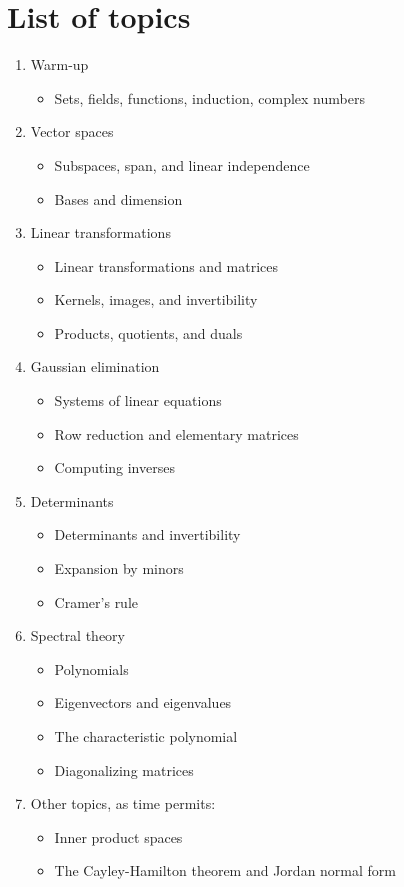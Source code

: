 \documentclass[11pt,oneside]{amsart}
\begin{document}
\section{List of topics}
\begin{enumerate}
    \item Warm-up
    \begin{itemize}
        \item Sets, fields, functions, induction, complex numbers
    \end{itemize}

    \item Vector spaces
    \begin{itemize}
        \item Subspaces, span, and linear independence
        \item Bases and dimension
    \end{itemize}

    \item Linear transformations
    \begin{itemize}
        \item Linear transformations and matrices
        \item Kernels, images, and invertibility
        \item Products, quotients, and duals
    \end{itemize}

    \item Gaussian elimination
    \begin{itemize}
        \item Systems of linear equations
        \item Row reduction and elementary matrices
        \item Computing inverses
    \end{itemize}

    \item Determinants
    \begin{itemize}
        \item Determinants and invertibility
        \item Expansion by minors
        \item Cramer's rule
    \end{itemize}

    \item Spectral theory
    \begin{itemize}
        \item Polynomials
        \item Eigenvectors and eigenvalues
        \item The characteristic polynomial
        \item Diagonalizing matrices
    \end{itemize}

    \item Other topics, as time permits:
    \begin{itemize}
        \item Inner product spaces
        \item The Cayley-Hamilton theorem and Jordan normal form
    \end{itemize}
\end{enumerate}
\end{document}
